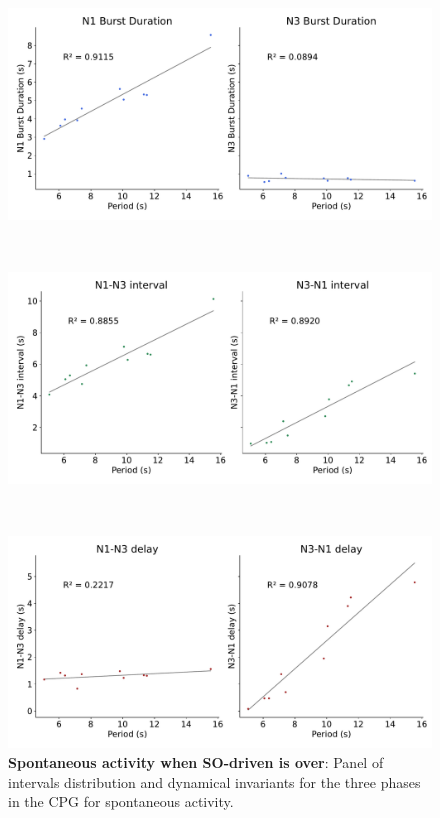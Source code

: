 \begin{figure}[htbp]
\begin{minipage}{0.9\textwidth}
\begin{minipage}[b]{0.53\textwidth}
			\centering
			\begin{minipage}[b]{\textwidth}
				\centering
				\includegraphics[width=\textwidth]{./invariants/data/SUSSEX/prep4_so_no_driven/images/prep4_so_no_driven_durations.pdf}
			\end{minipage}\\
			\begin{minipage}[b]{\textwidth}
				\centering
				\includegraphics[width=\textwidth]{./invariants/data/SUSSEX/prep4_so_no_driven/images/prep4_so_no_driven_intervals.pdf}
			\end{minipage}\\
			\begin{minipage}[b]{\textwidth}
				\centering
				\includegraphics[width=\textwidth]{./invariants/data/SUSSEX/prep4_so_no_driven/images/prep4_so_no_driven_delays.pdf}
			\end{minipage}
		\end{minipage}
	\end{minipage}
	\caption{\textbf{Spontaneous activity when SO-driven is over}: Panel of intervals distribution and dynamical invariants for the three phases in the CPG for spontaneous activity.}
	\label{fig:no so spontaneous invariants}
\end{figure}
 	
